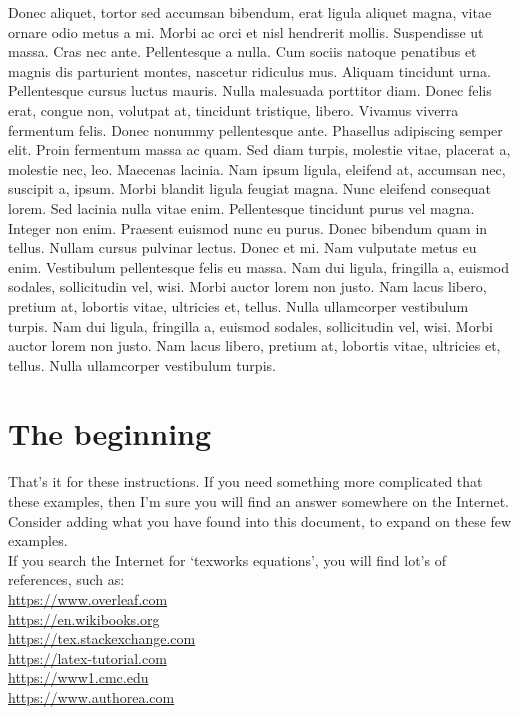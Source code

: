 Donec aliquet, tortor sed accumsan bibendum, erat ligula aliquet magna, vitae ornare odio metus a mi. Morbi ac orci et nisl hendrerit mollis. Suspendisse ut massa. Cras nec ante. Pellentesque a nulla. Cum sociis natoque penatibus et magnis dis parturient montes, nascetur ridiculus mus. Aliquam tincidunt urna. Pellentesque cursus luctus mauris. Nulla malesuada porttitor diam. Donec felis erat, congue non, volutpat at, tincidunt tristique, libero. Vivamus viverra fermentum felis. Donec nonummy pellentesque ante. Phasellus adipiscing semper elit. Proin fermentum massa ac quam. Sed diam turpis, molestie vitae, placerat a, molestie nec, leo. Maecenas lacinia. Nam ipsum ligula, eleifend at, accumsan nec, suscipit a, ipsum. Morbi blandit ligula feugiat magna. Nunc eleifend consequat lorem. Sed lacinia nulla vitae enim. Pellentesque tincidunt purus vel magna. Integer non enim. Praesent euismod nunc eu purus. Donec bibendum quam in tellus. Nullam cursus pulvinar lectus. Donec et mi. Nam vulputate metus eu enim. Vestibulum pellentesque felis eu massa. Nam dui ligula, fringilla a, euismod sodales, sollicitudin vel, wisi. Morbi auctor lorem non justo. Nam lacus libero, pretium at, lobortis vitae, ultricies et, tellus.   Nulla ullamcorper vestibulum turpis. Nam dui ligula, fringilla a, euismod sodales, sollicitudin vel, wisi. Morbi auctor lorem non justo. Nam lacus libero, pretium at, lobortis vitae, ultricies et, tellus.   Nulla ullamcorper vestibulum turpis.

\section{The beginning}

That's it for these instructions.  If you need something more complicated that these examples, then I'm sure you will find an answer somewhere on the Internet.  Consider adding what you have found into this document, to expand on these few examples.\\

If you search the Internet for `texworks equations', you will find lot's of references, such as:\\

\url{https://www.overleaf.com}\\

\url{https://en.wikibooks.org}\\

\url{https://tex.stackexchange.com}\\

\url{https://latex-tutorial.com}\\

\url{https://www1.cmc.edu}\\

\url{https://www.authorea.com}\\


